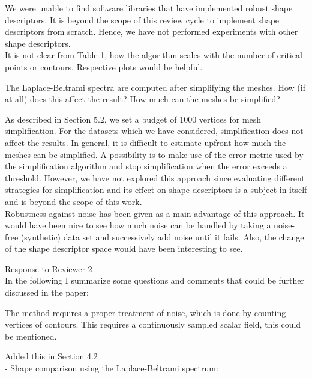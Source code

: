 \documentclass[10pt]{article}
\begin{document}
   {\color{blue} We were unable to find software libraries that have implemented
	robust shape descriptors. It is beyond the scope of this review cycle
	to implement shape descriptors from scratch. Hence, we have not
performed experiments with other shape descriptors.}\\

   It is not clear from Table 1, how the algorithm scales with the number
   of critical points or contours. Respective plots would be helpful.

   The Laplace-Beltrami spectra are computed after simplifying the meshes.
   How (if at all) does this affect the result? How much can the meshes be
   simplified?

   {\color{blue}As described in Section 5.2, we set a budget of 1000 vertices
	   for mesh simplification. For the datasets which we have considered,
	   simplification does not affect the results. In general, it is difficult
	   to estimate upfront how much the meshes can be simplified. A possibility
	   is to make use of the error metric used by the simplification algorithm
	   and stop simplification when the error exceeds a threshold. However, we have
	   not explored this approach since evaluating different strategies for simplification
	   and its effect on shape descriptors is a subject in itself and is beyond the scope
   of this work.}\\

   Robustness against noise has been given as a main advantage of this
   approach. It would have been nice to see how much noise can be handled by
   taking a noise-free (synthetic) data set and successively add noise until
   it fails. Also, the change of the shape descriptor space would have been
   interesting to see.



{\noindent \LARGE Response to Reviewer 2}\\

	In the following I summarize some questions and comments that could be
   further discussed in the paper:

   The method requires a proper treatment of noise, which is done by
   counting vertices of contours. This requires a continuously sampled
   scalar field, this could be mentioned.

   {\color{blue}Added this in Section 4.2}\\

   - Shape comparison using the Laplace-Beltrami spectrum:
\end{document}
